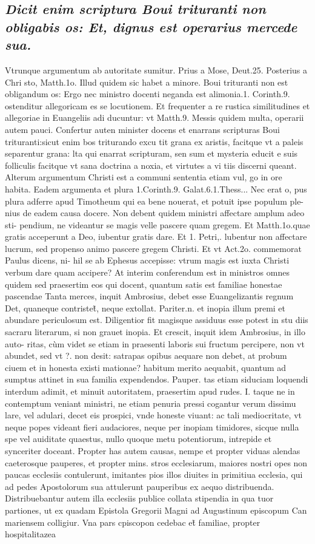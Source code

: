 \documentclass{article}
\begin{document}
\begin{pages}
\subsection*{\textit{Dicit enim scriptura Boui trituranti non obligabis os: Et, dignus est operarius mercede sua. }}\pstart Vtrunque argumentum ab autoritate sumitur. Prius a Mose, Deut.25. Posterius a Chri sto, Matth.1o. Illud quidem sic habet a minore. Boui trituranti non est obligandum os: Ergo nec ministro docenti neganda est alimonia.1. Corinth.9. ostenditur allegoricam es se locutionem. Et frequenter a re rustica similitudines et allegoriae in Euangeliis adi ducuntur: vt Matth.9. Messis quidem multa, operarii autem pauci. Confertur auten minister docens et enarrans scripturas Boui trituranti:sicut enim bos triturando excu tit grana ex aristis, facitque vt a paleis separentur grana: lta qui enarrat scripturam, sen sum et mysteria educit e suis folliculis facitque vt sana doctrina a noxia, et virtutes a vi tiis discerni queant. Alterum argumentum Christi est a communi sententia etiam vul, go in ore habita. Eadem argumenta et plura 1.Corinth.9. Galat.6.1.Thess... Nec erat o, pus plura adferre apud Timotheum qui ea bene nouerat, et potuit ipse populum ple- nius de eadem causa docere. Non debent quidem ministri affectare amplum adeo sti- pendium, ne videantur se magis velle pascere quam gregem. Et Matth.1o.quae gratis acceperunt a Deo, iubentur gratis dare. Et 1. Petri,. lubentur non affectare lucrum, sed propenso animo pascere gregem Christi. Et vt Act.2o. commemorat Paulus dicens, ni- hil se ab Ephesus accepisse: vtrum magis est iuxta Christi verbum dare quam accipere? At interim conferendum est in ministros omnes quidem sed praesertim eos qui docent, quantum satis est familiae honestae pascendae Tanta merces, inquit Ambrosius, debet esse Euangelizantis regnum Det, quaneque contristet̃, neque extollat. Pariter.n. et inopia illum premi et abundare periculosum est. Diligentior fit magisque assiduus esse potest in stu diis sacraru literarum, si non grauet inopia. Et crescit, inquit idem Ambrosius, in illo auto- ritas, cùm videt se etiam in praesenti laboris sui fructum percipere, non vt abundet, sed vt ?.  non desit: satrapas opibus aequare non debet, at probum ciuem et in honesta existi mationae? habitum merito aequabit, quantum ad sumptus attinet in sua familia expendendos. Pauper. tas etiam siduciam loquendi interdum adimit, et minuit autoritatem, praesertim apud rudes. I. taque ne in contemptum veniant ministri, ne etiam penuria pressi cogantur verum dissimu lare, vel adulari, decet eis prospici, vnde honeste viuant: ac tali mediocritate, vt neque popes videant fieri audaciores, neque per inopiam timidores, sicque nulla spe vel auiditate quaestus, nullo quoque metu potentiorum, intrepide et synceriter doceant. Propter has autem causas, nempe et propter viduas alendas caeterosque pauperes, et propter mins. stros ecclesiarum, maiores nostri opes non paucas ecclesiis contulerunt, imitantes pios illos diuites in primitiua ecclesia, qui ad pedes Apostolorum sua attulerunt pauperibus ex aequo distribuenda. Distribuebantur autem illa ecclesiis publice collata stipendia in qua tuor partiones, ut ex quadam Epistola Gregorii Magni ad Augustinum episcopum Can mariensem colligiur. Vna pars cpiscopon cedebac et̃ familiae, propter hospitalitazea  \pend

\end{pages}
\end{document}
